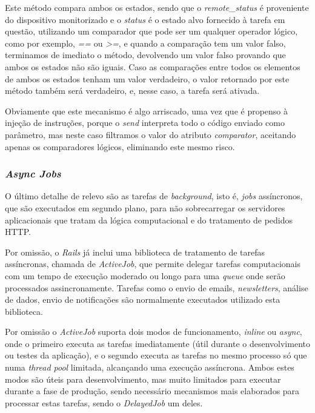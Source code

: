 Este método compara ambos os estados, sendo que o \textit{remote\_status} é proveniente do dispositivo monitorizado e o \textit{status} é o estado alvo fornecido à tarefa em questão, utilizando um comparador que pode ser um qualquer operador lógico, como por exemplo, \textit{==} ou \textit{>=}, e quando a comparação tem um valor falso, terminamos de imediato o método, devolvendo um valor falso provando que ambos os estados não são iguais. Caso as comparações entre todos os elementos de ambos os estados tenham um valor verdadeiro, o valor retornado por este método também será verdadeiro, e, nesse caso, a tarefa será ativada.

Obviamente que este mecanismo é algo arriscado, uma vez que é propenso à injeção de instruções, porque o \textit{send} interpreta todo o código enviado como parâmetro, mas neste caso filtramos o valor do atributo \textit{comparator}, aceitando apenas os comparadores lógicos, eliminando este mesmo risco.

\subsubsection{\textit{Async Jobs}}

O último detalhe de relevo são as tarefas de \textit{background}, isto é, \textit{jobs} assíncronos, que são executados em segundo plano, para não sobrecarregar os servidores aplicacionais que tratam da lógica computacional e do tratamento de pedidos HTTP.

Por omissão, o \textit{Rails} já inclui uma biblioteca de tratamento de tarefas assíncronas, chamada de \textit{ActiveJob}, que permite delegar tarefas computacionais com um tempo de execução moderado ou longo para uma \textit{queue} onde serão processados assincronamente. Tarefas como o envio de emails, \textit{newsletters}, análise de dados, envio de notificações são normalmente executados utilizado esta biblioteca. 

Por omissão o \textit{ActiveJob} suporta dois modos de funcionamento, \textit{inline} ou \textit{async}, onde o primeiro executa as tarefas imediatamente (útil durante o desenvolvimento ou testes da aplicação), e o segundo executa as tarefas no mesmo processo só que numa \textit{thread pool} limitada, alcançando uma execução assíncrona. Ambos estes modos são úteis para desenvolvimento, mas muito limitados para executar durante a fase de produção, sendo necessário mecanismos mais elaborados para processar estas tarefas, sendo o \textit{DelayedJob} um deles. 

